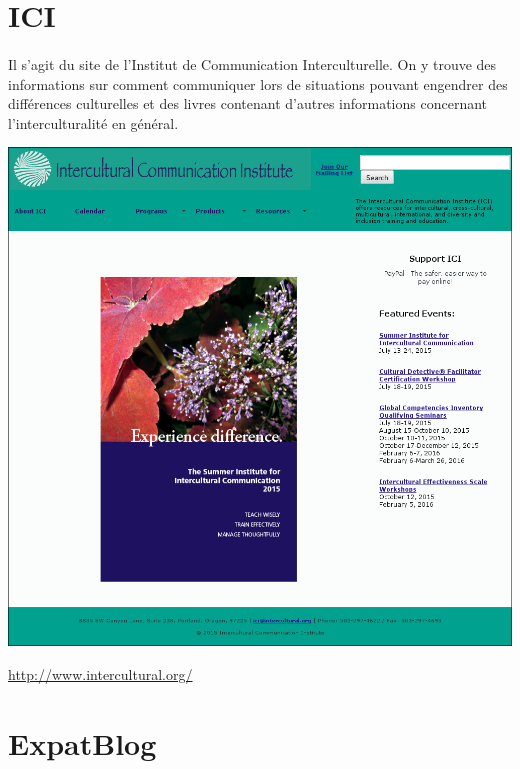 \section{ICI}

\paragraph{} Il s'agit du site de l'Institut de Communication Interculturelle.
On y trouve des informations sur comment communiquer lors de situations
pouvant engendrer des différences culturelles et des livres contenant d'autres
informations concernant l'interculturalité en général.

\begin{center}
	\includegraphics[scale=0.25]{Intercultural.png}
\end{center}
\url{http://www.intercultural.org/}

\section{ExpatBlog}
